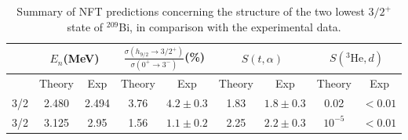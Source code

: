 \begin{table}
	\begin{tabular}{|c|c|c|c|c|c|c|c|c|}
		\hline
		& \multicolumn{2}{|c}{$E_n$(MeV)} & \multicolumn{2}{|c}{$\frac{\sigma(h_{9/2}\rightarrow 3/2^+)}{\sigma(0^+\rightarrow 3^-)}$(\%)} & \multicolumn{2}{|c}{$S(t,\alpha)$}  & \multicolumn{2}{|c|}{$S(^3\text{He},d)$}   \\
		\hline
		&Theory  & Exp  & Theory  & Exp & Theory & Exp & Theory  & Exp  \\
		\hline
		3/2& 2.480 & 2.494  & 3.76  & $4.2\pm0.3$  & 1.83  & $1.8\pm0.3$ &0.02  & $<0.01$  \\
		3/2& 3.125 & 2.95  & 1.56 & $1.1\pm0.2$  & 2.25  & $2.2\pm0.3$ & $10^{-5}$  & $<0.01$  \\
		\hline
	\end{tabular}\caption{Summary of NFT predictions concerning the structure of the two lowest $3/2^+$ state of $^{209}$Bi, in comparison with the experimental data.}\label{tabintroC3}
\end{table}






